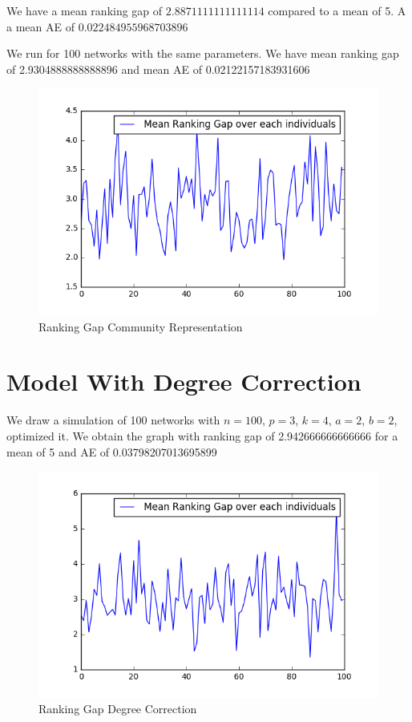 \documentclass[12pt]{ociamthesis}  %
\begin{document}
	We have a mean ranking gap of $2.8871111111111114$ compared to a mean of 5. A a mean AE of $0.022484955968703896$
	
	
	We run for 100 networks with the same parameters.
	We have mean ranking gap of 2.9304888888888896 and mean AE of 0.02122157183931606
	
	\begin{figure}
		\centering
		\includegraphics[width=\textwidth,height=\textheight,keepaspectratio]{SimulationGap100}
		\caption{Ranking Gap Community Representation}
		\label{label-image13}
	\end{figure}
	
	
	\section{Model With Degree Correction}
	
	We draw a simulation of 100 networks with $n = 100$, $ p = 3$, $k = 4$, $a = 2$, $b = 2$, optimized it. We obtain the graph with ranking gap of 2.942666666666666 for a mean of 5 and AE of 0.03798207013695899
	
	\begin{figure}
		\centering
		\includegraphics[width=\textwidth,height=\textheight,keepaspectratio]{SimulationGapDegreeCorr}
		\caption{Ranking Gap Degree Correction}
		\label{label-image14}
	\end{figure}
	
\end{document}
